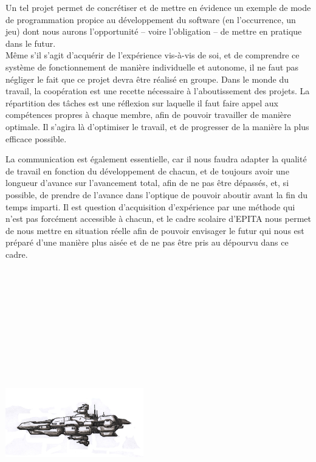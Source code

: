 \documentclass[10pt, titlepage]{report}
\begin{document}
Un tel projet permet de concrétiser et de mettre en évidence un exemple de mode de programmation propice au développement du software (en l’occurrence, un jeu) dont nous aurons l'opportunité – voire l'obligation – de mettre en pratique dans le futur.\\

Même s'il s'agit d'acquérir de l'expérience vis-à-vis de soi, et de comprendre ce système de fonctionnement de manière individuelle et autonome, il ne faut pas négliger le fait que ce projet devra être réalisé en groupe. Dans le monde du travail, la coopération est une recette nécessaire à l'aboutissement des projets. La répartition des tâches est une réflexion sur laquelle il faut faire appel aux compétences propres à chaque membre, afin de pouvoir travailler de manière optimale. Il s'agira là d'optimiser le travail, et de progresser de la manière la plus efficace possible.

La communication est également essentielle, car il nous faudra adapter la qualité de travail en fonction du développement de chacun, et de toujours avoir une longueur d'avance sur l'avancement total, afin de ne pas être dépassés, et, si possible, de prendre de l'avance dans l'optique de pouvoir aboutir avant la fin du temps imparti. Il est question d'acquisition d'expérience par une méthode qui n'est pas forcément accessible à chacun, et le cadre scolaire d'EPITA nous permet de nous mettre en situation réelle afin de pouvoir envisager le futur qui nous est préparé d'une manière plus aisée et de ne pas être pris au dépourvu dans ce cadre.\\ \\ \\ \\ \\ \\ \\ \\ \\ \\ \\

\begin{center}
\centering
\includegraphics[height=3cm, width=6cm]{c.jpg}
\end{center}
\end{document}
